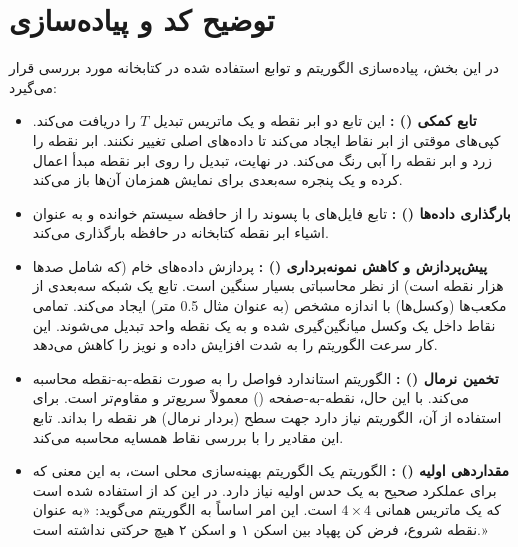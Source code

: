 \documentclass[12pt,a4paper]{article}
\begin{document}
\section{توضیح کد و پیاده‌سازی}
در این بخش، پیاده‌سازی الگوریتم و توابع استفاده شده در کتابخانه  مورد بررسی قرار می‌گیرد:

\begin{itemize}
	\item \textbf{تابع کمکی () :} این تابع دو ابر نقطه و یک ماتریس تبدیل $T$ را دریافت می‌کند. کپی‌های موقتی از ابر نقاط ایجاد می‌کند تا داده‌های اصلی تغییر نکنند. ابر نقطه   را زرد و ابر نقطه   را آبی رنگ می‌کند. در نهایت، تبدیل را روی ابر نقطه مبدأ اعمال کرده و یک پنجره سه‌بعدی برای نمایش همزمان آن‌ها باز می‌کند.
	
	\item \textbf{بارگذاری داده‌ها () :} تابع  فایل‌های با پسوند  را از حافظه سیستم خوانده و به عنوان اشیاء ابر نقطه کتابخانه  در حافظه بارگذاری می‌کند.
	
	\item \textbf{پیش‌پردازش و کاهش نمونه‌برداری () :} پردازش داده‌های خام  (که شامل صدها هزار نقطه است) از نظر محاسباتی بسیار سنگین است. تابع  یک شبکه سه‌بعدی از مکعب‌ها (وکسل‌ها) با اندازه مشخص (به عنوان مثال 0.5 متر) ایجاد می‌کند. تمامی نقاط داخل یک وکسل میانگین‌گیری شده و به یک نقطه واحد تبدیل می‌شوند. این کار سرعت الگوریتم  را به شدت افزایش داده و نویز را کاهش می‌دهد.
	
	\item \textbf{تخمین نرمال () :} الگوریتم استاندارد  فواصل را به صورت نقطه-به-نقطه محاسبه می‌کند. با این حال،  نقطه-به-صفحه () معمولاً سریع‌تر و مقاوم‌تر است. برای استفاده از آن، الگوریتم نیاز دارد جهت سطح (بردار نرمال) هر نقطه را بداند. تابع  این مقادیر را با بررسی نقاط همسایه محاسبه می‌کند.
	
	\item \textbf{مقداردهی اولیه () :} الگوریتم  یک الگوریتم بهینه‌سازی محلی است، به این معنی که برای عملکرد صحیح به یک حدس اولیه نیاز دارد. در این کد از  استفاده شده است که یک ماتریس همانی $4 \times 4$ است. این امر اساساً به الگوریتم می‌گوید: «به عنوان نقطه شروع، فرض کن پهپاد بین اسکن ۱ و اسکن ۲ هیچ حرکتی نداشته است.»
\end{itemize}
\end{document}
